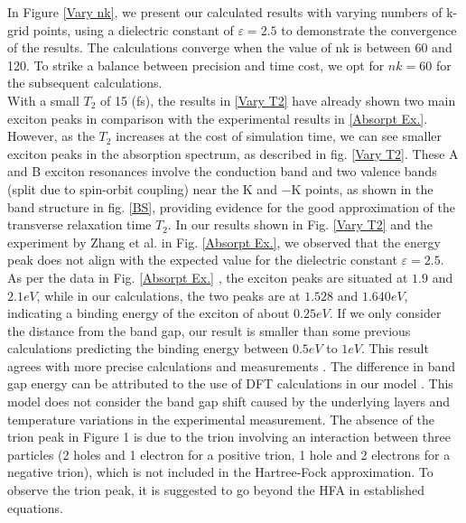 \documentclass[12pt,english,a4paper]{article}
\begin{document}
\quad In Figure \ref{Vary nk}, we present our calculated results with varying numbers of k-grid points, using a dielectric constant of $\varepsilon = 2.5$ to demonstrate the convergence of the results. The calculations converge when the value of nk is between 60 and 120. To strike a balance between precision and time cost, we opt for $nk = 60$ for the subsequent calculations.\\\null
\quad With a small $T_2$ of 15 (fs), the results in \ref{Vary T2} have already shown two main exciton peaks in comparison with the experimental results in \ref{Absorpt Ex.}. However, as the $T_2$ increases at the cost of simulation time, we can see smaller exciton peaks in the absorption spectrum, as described in fig. \ref{Vary T2}. These A and B exciton resonances involve the conduction band and two valence bands (split due to spin-orbit coupling) near the K and $-\mathrm{K}$ points, as shown in the band structure in fig. \ref{BS}, providing evidence for the good approximation of the transverse relaxation time $T_2$. In our results shown in Fig. \ref{Vary T2} and the experiment by Zhang et al. \cite{zhang_absorption_2014} in Fig. \ref{Absorpt Ex.}, we observed that the energy peak does not align with the expected value for the dielectric constant $\varepsilon = 2.5$. As per the data in Fig. \ref{Absorpt Ex.} \cite{zhang_absorption_2014}, the exciton peaks are situated at $1.9$ and $2.1 eV$, while in our calculations, the two peaks are at $1.528$ and $1.640 eV$, indicating a binding energy of the exciton of about $0.25 eV$. If we only consider the distance from the band gap, our result is smaller than some previous calculations predicting the binding energy between $0.5 eV$ to $1 eV$\cite{ramasubramaniam_large_2012,qiu_optical_2013,cheiwchanchamnangij_quasiparticle_2012, shi_quasiparticle_2013}. This result agrees with more precise calculations and measurements \cite{zhang_absorption_2014, kirichenko_influence_2021, zhang_direct_2014}. The difference in band gap energy can be attributed to the use of DFT calculations in our model \cite{liu_three-band_2013}. This model does not consider the band gap shift caused by the underlying layers and temperature variations in the experimental measurement. The absence of the trion peak in Figure 1 is due to the trion involving an interaction between three particles (2 holes and 1 electron for a positive trion, 1 hole and 2 electrons for a negative trion), which is not included in the Hartree-Fock approximation. To observe the trion peak, it is suggested to go beyond the HFA in established equations.\\
\end{document}
